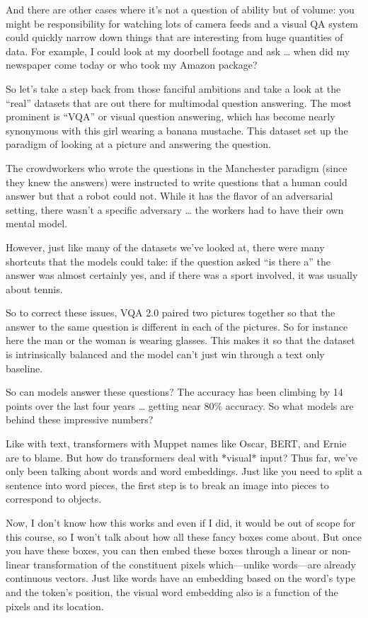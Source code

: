 And there are other cases where it’s not a question of ability but of volume: you might be responsibility for watching lots of camera feeds and a visual QA system could quickly narrow down things that are interesting from huge quantities of data.  For example, I could look at my doorbell footage and ask … when did my newspaper come today or who took my Amazon package?

So let’s take a step back from those fanciful ambitions and take a look at the “real” datasets that are out there for multimodal question answering.  The most prominent is “VQA” or visual question answering, which has become nearly synonymous with this girl wearing a banana mustache.  This dataset set up the paradigm of looking at a picture and answering the question.

The crowdworkers who wrote the questions in the Manchester paradigm (since they knew the answers) were instructed to write questions that a human could answer but that a robot could not.  While it has the flavor of an adversarial setting, there wasn’t a specific adversary … the workers had to have their own mental model.

However, just like many of the datasets we’ve looked at, there were many shortcuts that the models could take: if the question asked “is there a” the answer was almost certainly yes, and if there was a sport involved, it was usually about tennis.

So to correct these issues, VQA 2.0 paired two pictures together so that the answer to the same question is different in each of the pictures.  So for instance here the man or the woman is wearing glasses.  This makes it so that the dataset is intrinsically balanced and the model can’t just win through a text only baseline.

So can models answer these questions?  The accuracy has been climbing by 14 points over the last four years … getting near 80\% accuracy.  So what models are behind these impressive numbers?

Like with text, transformers with Muppet names like Oscar, BERT, and Ernie are to blame.  But how do transformers deal with *visual* input?  Thus far, we’ve only been talking about words and word embeddings.  Just like you need to split a sentence into word pieces, the first step is to break an image into pieces to correspond to objects.  

Now, I don’t know how this works and even if I did, it would be out of scope for this course, so I won’t talk about how all these fancy boxes come about.  But once you have these boxes, you can then embed these boxes through a linear or non-linear transformation of the constituent pixels which—unlike words—are already continuous vectors.  Just like words have an embedding based on the word’s type and the token’s position, the visual word embedding also is a function of the pixels and its location.


